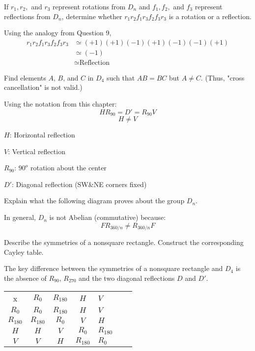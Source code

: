 \documentclass[11pt,largemargins]{homework}
\begin{document}
\question 
If $r_1,r_2,$ and $r_3$ represent rotations from $D_n$ and $f_1,f_2,$ and $f_3$ represent reflections from $D_n$, 
determine whether $r_1r_2f_1r_3f_2f_3r_3$ is a rotation or a reflection.

\quad Using the analogy from Question 9,
\begin{align*}
    r_1r_2f_1r_3f_2f_3r_3 &\simeq (+1)(+1)(-1)(+1)(-1)(-1)(+1)\\
                          &\simeq (-1)\\
                          &\simeq \text{Reflection}
\end{align*}

\question 
Find elements $A$, $B$, and $C$ in $D_4$ such that $AB=BC$ but $A\neq C$. (Thus, "cross cancellation" is not valid.)

\quad Using the notation from this chapter:
$$HR_{90} = D' = R_{90}V$$
$$H \neq V$$

\quad $H$: Horizontal reflection 

\quad $V$: Vertical reflection 

\quad $R_{90}$: $90^o$ rotation about the center

\quad $D'$: Diagonal reflection (SW\&NE corners fixed)

\question 
Explain what the following diagram proves about the group $D_n$.

\quad In general, $D_n$ is not Abelian (commutative) because: $$FR_{360/n}\neq R_{360/n}F$$

\question 
Describe the symmetries of a nonsquare rectangle. Construct the corresponding Cayley table.

\quad The key difference between the symmetries of a nonsquare rectangle and $D_4$ is the absence of $R_{90}$, $R_{270}$ and the 
two diagonal reflections $D$ and $D'$.

\centering
\begin{tabular}{cccclll}
   x         &  $R_0$     &  $R_{180}$  &  $H$       & $V$        \\
   $R_0$     &  $R_0$     &  $R_{180}$  &  $H$       & $V$        \\
   $R_{180}$ &  $R_{180}$ &  $R_0$      &  $V$       & $H$        \\
   $H$       &  $H$       &  $V$        &  $R_0$     & $R_{180}$  \\
   $V$       &  $V$       &  $H$        &  $R_{180}$ & $R_0$  
\end{tabular}
\end{document}
